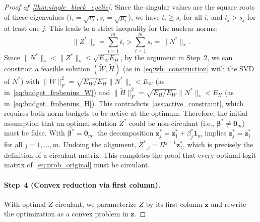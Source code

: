 \documentclass[11pt]{article}
\begin{document}
\begin{proof}[Proof of~\cref{thm:single_block_cyclic}]
Since the singular values are the square roots of these eigenvalues (\(t_i = \sqrt{\nu_i}, s_i=\sqrt{\mu_i}\)), we have \(t_i \ge s_i\) for all \(i\), and \(t_j > s_j\) for at least one \(j\).
This leads to a strict inequality for the nuclear norms:
\[ \|Z^*\|_* = \sum_{i=1}^m t_i > \sum_{i=1}^m s_i = \|N^*\|_*. \]
Since \(\|N^*\|_* < \|Z^*\|_* \le \sqrt{E_W E_H}\), by the argument in Step~2, we can construct a feasible solution \((\widetilde{W}, \widetilde{H})\) (as in~\cref{eq:wh_construction} with the SVD of \(N^*\)) with \(\|\widetilde{W}\|_F^2 = \sqrt{E_W/E_H}\|N^*\|_{*} < E_W\) (as in~\cref{eq:budget_frobenius_W}) and \(\|\widetilde{H}\|_F^2 = \sqrt{E_H/E_W}\|N^*\|_{*} < E_H\) (as in~\cref{eq:budget_frobenius_H}). 
This contradicts~\cref{ass:active_constraint}, which requires both norm budgets to be active at the optimum.
Therefore, the initial assumption that an optimal solution \(Z^*\) could be non-circulant (i.e., \(\boldsymbol{\beta}^* \neq \boldsymbol{0}_m\)) must be false.
With \(\boldsymbol{\beta}^* = \boldsymbol{0}_m\), the decomposition \(\boldsymbol{z}^*_j = \boldsymbol{z}^*_1 + \beta_j^*\boldsymbol{1}_m\) implies \(\boldsymbol{z}^*_j = \boldsymbol{z}^*_1\) for all \(j=1,\ldots,m\). Undoing the alignment, \(Z^*_{:,j} = \Pi^{j-1}\boldsymbol{z}^*_1\), which is precisely the definition of a circulant matrix. This completes the proof that every optimal logit matrix of~\cref{eq:prob_original} must be circulant. 

\paragraph{Step~4 (Convex reduction via first column).}
With optimal \(Z\) circulant, we parameterize \(Z\) by its first column \(\boldsymbol z\) and rewrite the optimization as a convex problem in \(\boldsymbol z\).


\end{proof}
\end{document}
